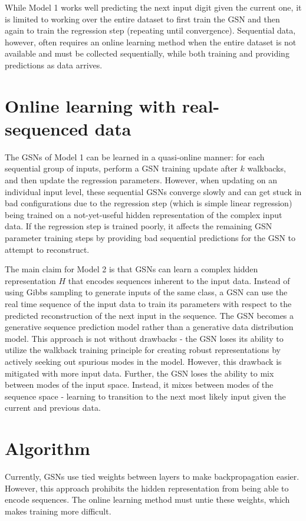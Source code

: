 While Model 1 works well predicting the next input digit given the current one, it is limited to working over the entire dataset to first train the GSN and then again to train the regression step (repeating until convergence). Sequential data, however, often requires an online learning method when the entire dataset is not available and must be collected sequentially, while both training and providing predictions as data arrives.

\section{Online learning with real-sequenced data }
The GSNs of Model 1 can be learned in a quasi-online manner: for each sequential group of inputs, perform a GSN training update after \(k\) walkbacks, and then update the regression parameters. However, when updating on an individual input level, these sequential GSNs converge slowly and can get stuck in bad configurations due to the regression step (which is simple linear regression) being trained on a not-yet-useful hidden representation of the complex input data. If the regression step is trained poorly, it affects the remaining GSN parameter training steps by providing bad sequential predictions for the GSN to attempt to reconstruct.

The main claim for Model 2 is that GSNs can learn a complex hidden representation \(H\) that encodes sequences inherent to the input data. Instead of using Gibbs sampling to generate inputs of the same class, a GSN can use the real time sequence of the input data to train its parameters with respect to the predicted reconstruction of the next input in the sequence. The GSN becomes a generative sequence prediction model rather than a generative data distribution model. This approach is not without drawbacks - the GSN loses its ability to utilize the walkback training principle for creating robust representations by actively seeking out spurious modes in the model. However, this drawback is mitigated with more input data.  Further, the GSN loses the ability to mix between modes of the input space. Instead, it mixes between modes of the sequence space - learning to transition to the next most likely input given the current and previous data.


\section{Algorithm}

Currently, GSNs use tied weights between layers to make backpropagation easier. However, this approach prohibits the hidden representation from being able to encode sequences. The online learning method must untie these weights, which makes training more difficult.

